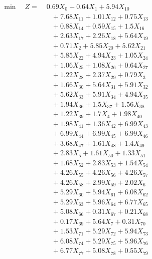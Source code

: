 \documentclass[a4paper,10pt]{article}
\begin{document}
\allowdisplaybreaks
{\small
\begin{align}
\min \quad Z = &\; 0.69X_{0} + 0.64X_{1} + 5.94X_{10} \\[0.5ex]
&\quad  + 7.68X_{11} + 1.01X_{12} + 0.75X_{13} \\[0.5ex]
&\quad  + 0.88X_{14} + 0.59X_{15} + 1.5X_{16} \\[0.5ex]
&\quad  + 2.63X_{17} + 2.26X_{18} + 5.64X_{19} \\[0.5ex]
&\quad  + 0.71X_{2} + 5.85X_{20} + 5.62X_{21} \\[0.5ex]
&\quad  + 5.85X_{22} + 4.94X_{23} + 1.05X_{24} \\[0.5ex]
&\quad  + 1.06X_{25} + 1.08X_{26} + 0.64X_{27} \\[0.5ex]
&\quad  + 1.22X_{28} + 2.37X_{29} + 0.79X_{3} \\[0.5ex]
&\quad  + 1.66X_{30} + 5.64X_{31} + 5.91X_{32} \\[0.5ex]
&\quad  + 5.62X_{33} + 5.91X_{34} + 4.94X_{35} \\[0.5ex]
&\quad  + 1.94X_{36} + 1.5X_{37} + 1.56X_{38} \\[0.5ex]
&\quad  + 1.22X_{39} + 1.7X_{4} + 1.98X_{40} \\[0.5ex]
&\quad  + 1.98X_{41} + 1.36X_{42} + 6.99X_{43} \\[0.5ex]
&\quad  + 6.99X_{44} + 6.99X_{45} + 6.99X_{46} \\[0.5ex]
&\quad  + 3.68X_{47} + 1.61X_{48} + 1.4X_{49} \\[0.5ex]
&\quad  + 2.83X_{5} + 1.61X_{50} + 1.33X_{51} \\[0.5ex]
&\quad  + 1.68X_{52} + 2.83X_{53} + 1.54X_{54} \\[0.5ex]
&\quad  + 4.26X_{55} + 4.26X_{56} + 4.26X_{57} \\[0.5ex]
&\quad  + 4.26X_{58} + 2.99X_{59} + 2.02X_{6} \\[0.5ex]
&\quad  + 5.29X_{60} + 5.94X_{61} + 6.08X_{62} \\[0.5ex]
&\quad  + 5.29X_{63} + 5.96X_{64} + 6.77X_{65} \\[0.5ex]
&\quad  + 5.08X_{66} + 0.31X_{67} + 0.21X_{68} \\[0.5ex]
&\quad  + 0.17X_{69} + 5.64X_{7} + 0.31X_{70} \\[0.5ex]
&\quad  + 1.53X_{71} + 5.29X_{72} + 5.94X_{73} \\[0.5ex]
&\quad  + 6.08X_{74} + 5.29X_{75} + 5.96X_{76} \\[0.5ex]
&\quad  + 6.77X_{77} + 5.08X_{78} + 0.55X_{79} \\[0.5ex]

\end{align}}
\end{document}
